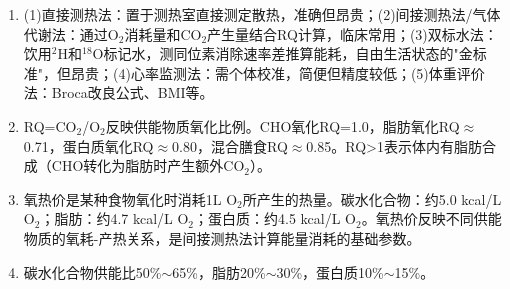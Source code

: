 {\begin{enumerate}[leftmargin=*, itemsep=5pt]
    \item (1)直接测热法：置于测热室直接测定散热，准确但昂贵；(2)间接测热法/气体代谢法：通过O$_2$消耗量和CO$_2$产生量结合RQ计算，临床常用；(3)双标水法：饮用$^2$H和$^{18}$O标记水，测同位素消除速率差推算能耗，自由生活状态的"金标准"，但昂贵；(4)心率监测法：需个体校准，简便但精度较低；(5)体重评价法：Broca改良公式、BMI等。
    \item RQ=CO$_2$/O$_2$反映供能物质氧化比例。CHO氧化RQ=1.0，脂肪氧化RQ$\approx$0.71，蛋白质氧化RQ$\approx$0.80，混合膳食RQ$\approx$0.85。RQ>1表示体内有脂肪合成（CHO转化为脂肪时产生额外CO$_2$）。
    \item 氧热价是某种食物氧化时消耗1L O$_2$所产生的热量。碳水化合物：约5.0 kcal/L O$_2$；脂肪：约4.7 kcal/L O$_2$；蛋白质：约4.5 kcal/L O$_2$。氧热价反映不同供能物质的氧耗-产热关系，是间接测热法计算能量消耗的基础参数。
    \item 碳水化合物供能比50\%$\sim$65\%，脂肪20\%$\sim$30\%，蛋白质10\%$\sim$15\%。
\end{enumerate}
}
\newpage
